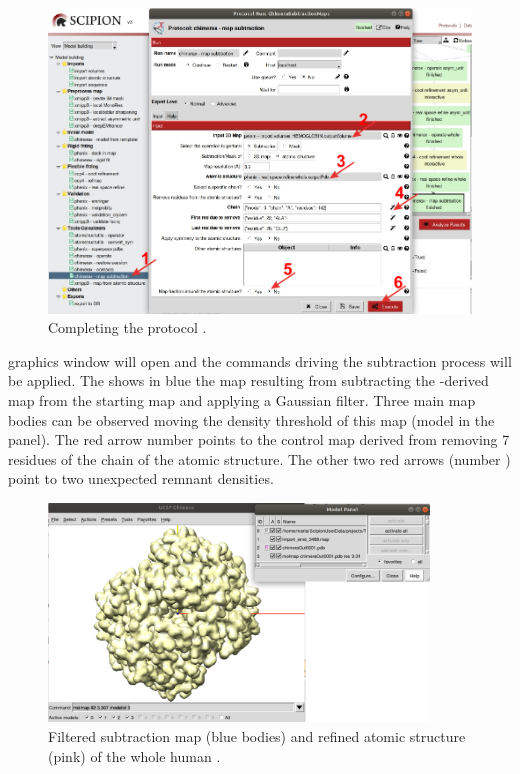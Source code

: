 \begin{itemize}
 \begin{figure}[H]
    \centering 
    \captionsetup{width=.9\linewidth} 
    \includegraphics[width=1\textwidth]{Images/Fig42}
    \caption{Completing the protocol .}
    \label{fig:chimera_map_subtract}
   \end{figure}
   
\chimera graphics window will open and the commands driving the subtraction process will be applied. The  shows in blue the map resulting from subtracting the -derived map from the starting map  and applying a Gaussian filter. Three main map bodies can be observed moving the density threshold of this map (model  in the  panel). The red arrow number  points to the control map derived from removing 7 residues of the chain  of the atomic structure. The other two red arrows (number ) point to two unexpected remnant densities. 

  \begin{figure}[H]
    \centering 
    \captionsetup{width=.9\linewidth} 
    \includegraphics[width=0.90\textwidth]{Images/Fig43}
    \caption{Filtered subtraction map (blue bodies) and refined atomic structure (pink) of the whole human .}
    \label{fig:chimera_map_subtract_2}
   \end{figure}


\end{itemize}
